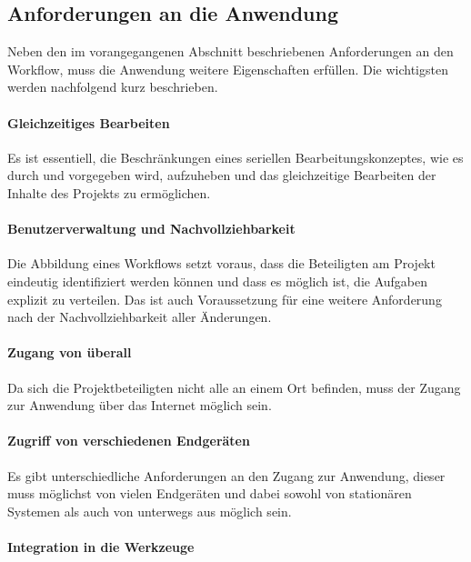 \pagebreak

\subsection{Anforderungen an die Anwendung}\label{l:anforderungen}

Neben den im vorangegangenen Abschnitt beschriebenen Anforderungen an den Workflow, muss die Anwendung weitere Eigenschaften erfüllen. Die wichtigsten werden nachfolgend kurz beschrieben.

\paragraph{Gleichzeitiges Bearbeiten}

Es ist essentiell, die Beschränkungen eines seriellen Bearbeitungskonzeptes, wie es durch  und  vorgegeben wird, aufzuheben und das gleichzeitige Bearbeiten der Inhalte des Projekts zu ermöglichen. 

\paragraph{Benutzerverwaltung und Nachvollziehbarkeit}

Die Abbildung eines Workflows setzt voraus, dass die Beteiligten am Projekt eindeutig identifiziert werden können und dass es möglich ist, die Aufgaben explizit zu verteilen. Das ist auch Voraussetzung für eine weitere Anforderung nach der Nachvollziehbarkeit aller Änderungen.

\paragraph{Zugang von überall}

Da sich die Projektbeteiligten nicht alle an einem Ort befinden, muss der Zugang zur Anwendung über das Internet möglich sein.

\paragraph{Zugriff von verschiedenen Endgeräten}

Es gibt unterschiedliche Anforderungen an den Zugang zur Anwendung, dieser muss möglichst von vielen Endgeräten und dabei sowohl von stationären Systemen als auch von unterwegs aus möglich sein.

\paragraph{Integration in die Werkzeuge}

